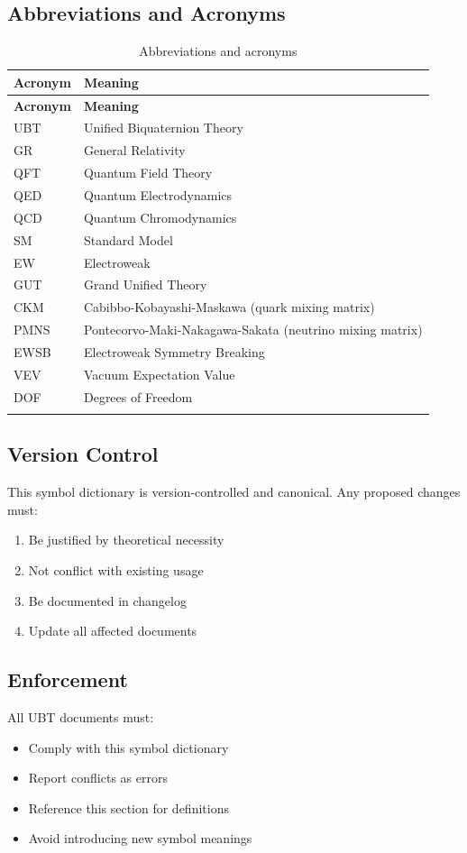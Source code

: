 \subsection{Abbreviations and Acronyms}

\begin{longtable}{|l|p{8cm}|}
\hline
\textbf{Acronym} & \textbf{Meaning} \\
\hline
\endfirsthead
\hline
\textbf{Acronym} & \textbf{Meaning} \\
\hline
\endhead

UBT & Unified Biquaternion Theory \\
\hline
GR & General Relativity \\
\hline
QFT & Quantum Field Theory \\
\hline
QED & Quantum Electrodynamics \\
\hline
QCD & Quantum Chromodynamics \\
\hline
SM & Standard Model \\
\hline
EW & Electroweak \\
\hline
GUT & Grand Unified Theory \\
\hline
CKM & Cabibbo-Kobayashi-Maskawa (quark mixing matrix) \\
\hline
PMNS & Pontecorvo-Maki-Nakagawa-Sakata (neutrino mixing matrix) \\
\hline
EWSB & Electroweak Symmetry Breaking \\
\hline
VEV & Vacuum Expectation Value \\
\hline
DOF & Degrees of Freedom \\
\hline

\caption{Abbreviations and acronyms}
\label{tab:canonical:abbreviations}
\end{longtable}

\subsection{Version Control}

This symbol dictionary is version-controlled and canonical. Any proposed changes must:
\begin{enumerate}
    \item Be justified by theoretical necessity
    \item Not conflict with existing usage
    \item Be documented in changelog
    \item Update all affected documents
\end{enumerate}

\subsection{Enforcement}

All UBT documents must:
\begin{itemize}
    \item Comply with this symbol dictionary
    \item Report conflicts as errors
    \item Reference this section for definitions
    \item Avoid introducing new symbol meanings
\end{itemize}

